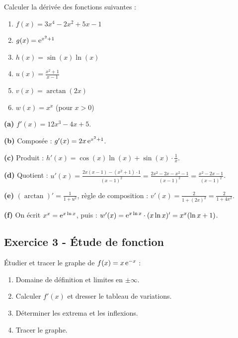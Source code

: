 \documentclass[12pt,a4paper]{article}
\begin{document}
\begin{boiteexercice}
Calculer la dérivée des fonctions suivantes :
\begin{enumerate}[label=(\alph*)]
  \item $f(x) = 3x^4 - 2x^2 + 5x - 1$
  \item $g(x) = \mathrm{e}^{x^2+1}$
  \item $h(x) = \sin(x)\ln(x)$
  \item $u(x) = \frac{x^2+1}{x-1}$
  \item $v(x) = \arctan(2x)$
  \item $w(x) = x^x$ (pour $x>0$)
\end{enumerate}
\end{boiteexercice}

\begin{boitecorrige}
\textbf{(a)} $f'(x) = 12x^3 - 4x + 5$.

\textbf{(b)} Composée : $g'(x) = 2x\,\mathrm{e}^{x^2+1}$.

\textbf{(c)} Produit : $h'(x) = \cos(x)\ln(x) + \sin(x)\cdot\frac{1}{x}$.

\textbf{(d)} Quotient : $u'(x) = \frac{2x(x-1)-(x^2+1)\cdot1}{(x-1)^2} = \frac{2x^2-2x-x^2-1}{(x-1)^2} = \frac{x^2-2x-1}{(x-1)^2}$.

\textbf{(e)} $(\arctan)' = \frac{1}{1+u^2}$, règle de composition : $v'(x) = \frac{2}{1+(2x)^2} = \frac{2}{1+4x^2}$.

\textbf{(f)} On écrit $x^x = \mathrm{e}^{x\ln x}$, puis :
$w'(x) = \mathrm{e}^{x\ln x}\cdot(x\ln x)' = x^x(\ln x + 1)$.
\end{boitecorrige}

\subsection*{Exercice 3 - Étude de fonction \niveau{\moyen}}

\begin{boiteexercice}
Étudier et tracer le graphe de $f(x) = x\,\mathrm{e}^{-x}$ :
\begin{enumerate}
  \item Domaine de définition et limites en $\pm\infty$.
  \item Calculer $f'(x)$ et dresser le tableau de variations.
  \item Déterminer les extrema et les inflexions.
  \item Tracer le graphe.
\end{enumerate}
\end{boiteexercice}
\end{document}
